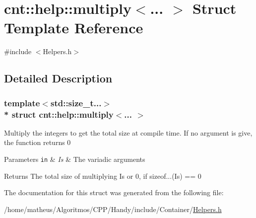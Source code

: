 \hypertarget{structcnt_1_1help_1_1multiply}{}\section{cnt\+:\+:help\+:\+:multiply$<$... $>$ Struct Template Reference}
\label{structcnt_1_1help_1_1multiply}


{\ttfamily \#include $<$Helpers.\+h$>$}



\subsection{Detailed Description}
\subsubsection*{template$<$std\+::size\+\_\+t...$>$\\*
struct cnt\+::help\+::multiply$<$... $>$}

Multiply the integers to get the total size at compile time. If no argument is give, the function returns 0


\begin{DoxyParams}[1]{Parameters}
\mbox{\tt in}  & {\em Is} & The variadic arguments \\
\hline
\end{DoxyParams}
\begin{DoxyReturn}{Returns}
The total size of multiplying Is or 0, if sizeof...(Is) == 0 
\end{DoxyReturn}


The documentation for this struct was generated from the following file\+:\begin{DoxyCompactItemize}
\item 
/home/matheus/\+Algoritmos/\+C\+P\+P/\+Handy/include/\+Container/\hyperlink{Container_2Helpers_8h}{Helpers.\+h}\end{DoxyCompactItemize}
